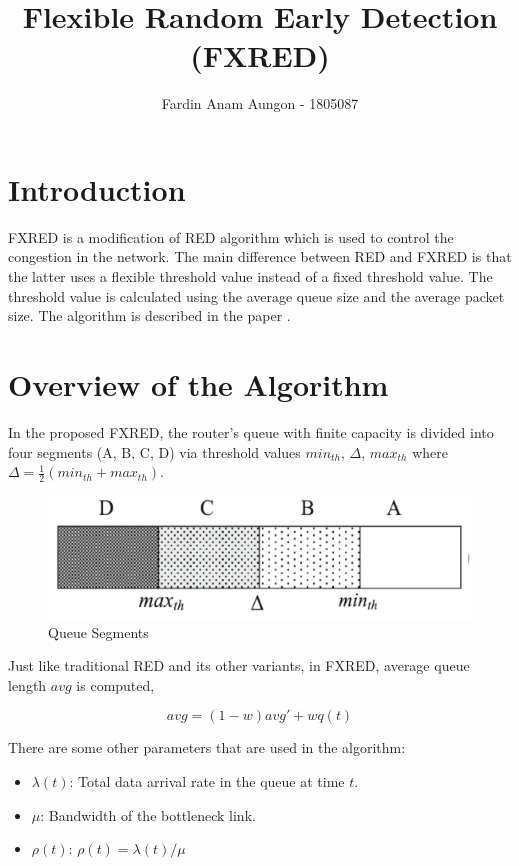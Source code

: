 \documentclass[10pt]{report}
\title{Flexible Random Early Detection (FXRED)}
\author{Fardin Anam Aungon - 1805087}
\date{}
\begin{document}
\maketitle

\section*{Introduction}
FXRED is a modification of RED algorithm which is used to control the congestion in the network. The main difference between RED and FXRED is that the latter uses a flexible threshold value instead of a fixed threshold value. The threshold value is calculated using the average queue size and the average packet size. The algorithm is described in the paper \cite{inproceedings}.

\section*{Overview of the Algorithm}
In the proposed FXRED, the router's queue with finite capacity is divided into four segments (A, B, C, D) via threshold values $min_{th}$, $\Delta$, $max_{th}$ where $\Delta = \frac{1}{2} (min_{th} + max_{th})$.

\begin{figure}[h]
    \centering
    \includegraphics[scale=0.5]{static/images/queue_segments.png}
    \caption{Queue Segments}
    \label{fig:queue_segments}
\end{figure}


Just like traditional RED and its other variants, in FXRED, average queue length $avg$ is computed,

$$avg = (1-w)avg' + wq(t)$$

There are some other parameters that are used in the algorithm:

\begin{itemize}
  \item $\lambda(t)$: Total data arrival rate in the queue at time $t$.
  \item $\mu$: Bandwidth of the bottleneck link.
  \item $\rho(t)$: $\rho(t) = \lambda(t)/\mu$
\end{itemize}
\end{document}
